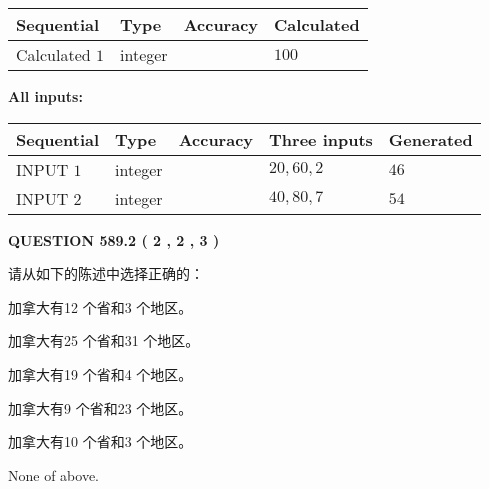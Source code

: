 \documentclass{ctexart}
\begin{document}
   
   
   
\noindent{}
   
   
  
  
\noindent\begin{tabular}{|l|l|l|l|}
\hline
 Sequential & Type & Accuracy & Calculated \\ 
\hline
 
 
  Calculated $  1 $ & integer &  & 
  $ 100 $ 
 \\  \hline  
 \end{tabular}
   
   
   
   
\noindent\vspace{0.1in}\hspace{-0.08in} {\textbf{\Large{All inputs: }}}
   
   
  
  
\noindent\begin{tabular}{|l|l|l|l|l|}
\hline
 Sequential & Type & Accuracy & Three inputs & Generated \\ 
\hline
 
 
  INPUT $  1 $ & integer &  & $
 20
 , 
 60
 , 
 2
 $ & $ 46 $ 
 \\  \hline  
 
 
  INPUT $  2 $ & integer &  & $
 40
 , 
 80
 , 
 7
 $ & $ 54 $ 
 \\  \hline  
 \end{tabular}
   
   
  
\vspace{0.2in}
  
{\textbf{\Large{QUESTION
589.2 
 ( 2 , 2 , 3 )
}}}
  
  
请从如下的陈述中选择正确的：
 
 
加拿大有12 个省和3 个地区。
 
 
加拿大有25 个省和31 个地区。
 
 
加拿大有19 个省和4 个地区。
 
 
加拿大有9 个省和23 个地区。
 
 
加拿大有10 个省和3 个地区。
 
 
 None of above.
 
 
\noindent{}
 
\end{document}

